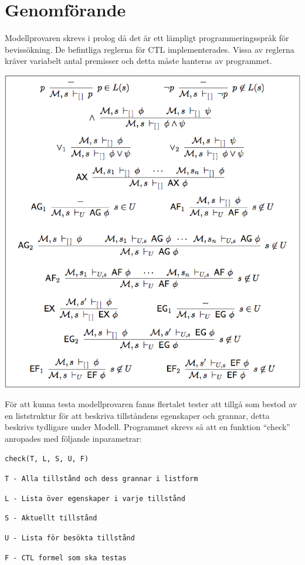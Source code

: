 \section{Genomförande}
Modellprovaren skrevs i prolog då det är ett lämpligt programmeringsspråk för bevissökning. De befintliga reglerna för CTL implementerades. Vissa av reglerna kräver variabelt antal premisser och detta måste hanteras av programmet.

\includegraphics[width=\textwidth]{formulas.eps}

För att kunna testa modellprovaren fanns flertalet tester att tillgå som bestod av en liststruktur för att beskriva tillståndens egenskaper och grannar, detta beskrivs tydligare under Modell.
Programmet skrevs så att en funktion “check” anropades med följande inparametrar:

\begin{center}
\begin{minipage}{0.75\textwidth}

\texttt{check(T, L, S, U, F)}

\texttt{T - Alla tillstånd och dess grannar i listform}

\texttt{L - Lista över egenskaper i varje tillstånd}

\texttt{S - Aktuellt tillstånd}

\texttt{U - Lista för besökta tillstånd}

\texttt{F - CTL formel som ska testas}

\end{minipage}
\end{center}

